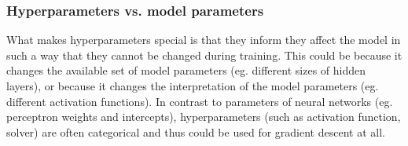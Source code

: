     \subsubsection{Hyperparameters vs. model parameters}
    What makes hyperparameters special is that they inform they affect the model in such a way that they cannot be changed during training.
    This could be because it changes the available set of model parameters (eg. different sizes of hidden layers),
    or because it changes the interpretation of the model parameters (eg. different activation functions).
    In contrast to parameters of neural networks (eg. perceptron weights and intercepts),
    hyperparameters (such as activation function, solver) are often categorical and thus could be used for gradient descent at all.




